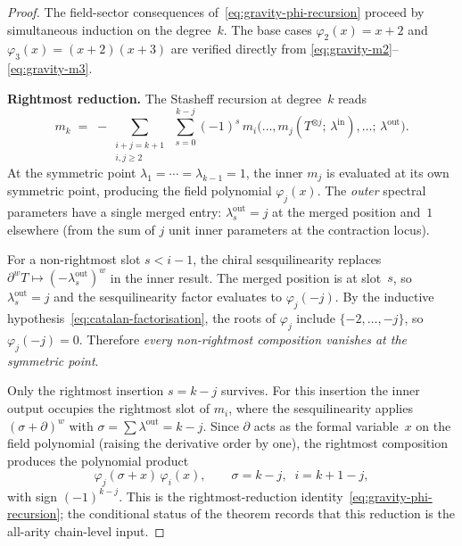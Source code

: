 \begin{proof}
The field-sector consequences of~\eqref{eq:gravity-phi-recursion}
proceed by simultaneous induction on the degree~$k$.  The base cases
$\varphi_2(x) = x + 2$ and
$\varphi_3(x) = (x{+}2)(x{+}3)$ are verified directly from
\eqref{eq:gravity-m2}--\eqref{eq:gravity-m3}.

\smallskip
\noindent\textbf{Rightmost reduction.}
The Stasheff recursion at degree~$k$ reads
\begin{equation}\label{eq:stasheff-sym-recursion}
m_k
\;=\;
-\!\!\sum_{\substack{i + j = k+1 \\ i,j \ge 2}}\;
\sum_{s=0}^{k-j}(-1)^s\,
m_i\bigl(\ldots, m_j(T^{\otimes j};\,
\lambda^{\mathrm{in}}), \ldots;\,\lambda^{\mathrm{out}}\bigr).
\end{equation}
At the symmetric point $\lambda_1 = \cdots = \lambda_{k-1} = 1$,
the inner $m_j$ is evaluated at its own symmetric point,
producing the field polynomial $\varphi_j(x)$. The
\emph{outer} spectral parameters have a single merged entry:
$\lambda^{\mathrm{out}}_s = j$ at the merged position and~$1$
elsewhere (from the sum of $j$ unit inner parameters at the
contraction locus).

For a non-rightmost slot $s < i-1$, the chiral sesquilinearity
replaces $\partial^w T \mapsto (-\lambda^{\mathrm{out}}_s)^w$
in the inner result. The merged position is at slot~$s$,
so $\lambda^{\mathrm{out}}_s = j$ and the sesquilinearity
factor evaluates to $\varphi_j(-j)$. By the inductive
hypothesis~\eqref{eq:catalan-factorisation}, the roots of
$\varphi_j$ include $\{-2, \ldots, -j\}$, so
$\varphi_j(-j) = 0$. Therefore \emph{every non-rightmost
composition vanishes at the symmetric point}.

Only the rightmost insertion $s = k - j$ survives. For this
insertion the inner output occupies the rightmost slot of
$m_i$, where the sesquilinearity applies
$(\sigma + \partial)^w$ with
$\sigma = \sum \lambda^{\mathrm{out}} = k - j$.
Since $\partial$ acts as the formal variable~$x$ on the field
polynomial (raising the derivative order by one), the
rightmost composition produces the polynomial product
\begin{equation}\label{eq:rightmost-product}
\varphi_j(\sigma + x)\,\varphi_i(x),
\qquad \sigma = k - j,\;\; i = k+1-j,
\end{equation}
with sign $(-1)^{k-j}$. This is the
rightmost-reduction identity~\eqref{eq:gravity-phi-recursion};
the conditional status of the theorem records that this reduction is
the all-arity chain-level input.


\end{proof}
